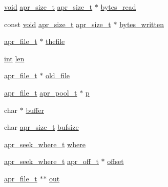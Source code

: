 \begin{DoxyCompactItemize}
\item 
\hyperlink{group__MOD__ISAPI_gacd6cdbf73df3d9eed42fa493d9b621a6}{void} \hyperlink{group__apr__platform_gaaa72b2253f6f3032cefea5712a27540e}{apr\+\_\+size\+\_\+t} \hyperlink{group__apr__platform_gaaa72b2253f6f3032cefea5712a27540e}{apr\+\_\+size\+\_\+t} $\ast$ \hyperlink{group__apr__file__io_ga6d0d38373afd55f3787eb6b338b6d938}{bytes\+\_\+read}
\item 
const \hyperlink{group__MOD__ISAPI_gacd6cdbf73df3d9eed42fa493d9b621a6}{void} \hyperlink{group__apr__platform_gaaa72b2253f6f3032cefea5712a27540e}{apr\+\_\+size\+\_\+t} \hyperlink{group__apr__platform_gaaa72b2253f6f3032cefea5712a27540e}{apr\+\_\+size\+\_\+t} $\ast$ \hyperlink{group__apr__file__io_ga7d9454fe5158de0840be4f856b193a87}{bytes\+\_\+written}
\item 
\hyperlink{structapr__file__t}{apr\+\_\+file\+\_\+t} $\ast$ \hyperlink{group__apr__file__io_ga78ca4b53249bdca0726c4ffec7132aa9}{thefile}
\item 
\hyperlink{pcre_8txt_a42dfa4ff673c82d8efe7144098fbc198}{int} \hyperlink{group__apr__file__io_gafed088663f8704004425cdae2120b9b3}{len}
\item 
\hyperlink{structapr__file__t}{apr\+\_\+file\+\_\+t} $\ast$ \hyperlink{group__apr__file__io_gaa84bca3ba7bffb38fe4cd7c53efcbccd}{old\+\_\+file}
\item 
\hyperlink{structapr__file__t}{apr\+\_\+file\+\_\+t} \hyperlink{structapr__pool__t}{apr\+\_\+pool\+\_\+t} $\ast$ \hyperlink{group__apr__file__io_ga2e727f881424334cf12d8af10f50ec6c}{p}
\item 
char $\ast$ \hyperlink{group__apr__file__io_gaff2566f4c366b48d73479bef43ee4d2e}{buffer}
\item 
char \hyperlink{group__apr__platform_gaaa72b2253f6f3032cefea5712a27540e}{apr\+\_\+size\+\_\+t} \hyperlink{group__apr__file__io_gaacff821b2b2a35a43f6b1db27538e122}{bufsize}
\item 
\hyperlink{group__apr__file__io_ga8eecd44975906042e0e369771802a145}{apr\+\_\+seek\+\_\+where\+\_\+t} \hyperlink{group__apr__file__io_ga36413100270e49e571f3f52170bc5a1f}{where}
\item 
\hyperlink{group__apr__file__io_ga8eecd44975906042e0e369771802a145}{apr\+\_\+seek\+\_\+where\+\_\+t} \hyperlink{group__apr__platform_ga6938af9075cec15c88299109381aa984}{apr\+\_\+off\+\_\+t} $\ast$ \hyperlink{group__apr__file__io_ga4704243ceda9c855bd1d45f917a9f73c}{offset}
\item 
\hyperlink{structapr__file__t}{apr\+\_\+file\+\_\+t} $\ast$$\ast$ \hyperlink{group__apr__file__io_gac9e69704674113c5d765224c9583db92}{out}
$$
\end{DoxyCompactItemize}
